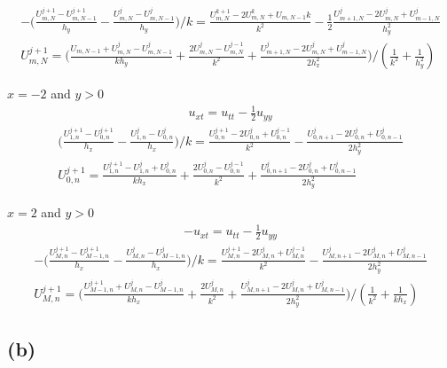 \documentclass[en,hazy,screen,blue,normal]{elegantnote}
\begin{document}
\begin{align*}
    - \biggl(\frac{U_{m, N}^{j+1} - U_{m, N-1}^{j+1}}{h_y} - \frac{U_{m, N}^j - U_{m, N-1}^j}{h_y}\biggr)/k = \frac{U_{m,N}^{k+1} - 2U_{m,N}^{k} + U_{m,N-1}{k}}{k^2} - \frac{1}{2} \frac{U_{m+1, N}^{j} - 2U_{m,N}^j + U_{m-1, N}^j}{h_y^2} \\
    U_{m, N}^{j+1} = \biggl(\frac{U_{m, N-1} + U_{m,N}^j - U_{m, N-1}^j}{k h_y} + \frac{2U_{m,N}^j - U_{m, N}^{j-1}}{k^2} + \frac{U_{m+1, N}^j - 2U_{m, N}^j + U_{m-1, N}^j}{2h_x^2} \biggr)/(\frac{1}{k^2} + \frac{1}{h_y^2})
\end{align*}

$x=-2$ and $y>0$
\begin{align*}
    u_{xt} = u_{tt} - \frac{1}{2} u_{yy}
\end{align*}
\begin{align*}
    \biggl(\frac{U_{1, n}^{j+1} - U_{0, n}^{j+1}}{h_x} - \frac{U_{1, n}^{j} - U_{0, n}^{j}}{h_x}\biggr)/k
    = \frac{U_{0, n}^{j+1} - 2U_{0, n}^j + U_{0, n}^{j-1}}{k^2} - \frac{U_{0, n+1}^j - 2U_{0, n}^j + U_{0, n-1}^j}{2 h_y^2} \\
    U_{0, n}^{j+1} = \frac{U_{1, n}^{j+1} - U_{1, n}^{j} + U_{0, n}^j}{k h_x} + \frac{2 U_{0, n}^{j} - U_{0, n}^{j-1}}{k^2} + \frac{U_{0, n+1}^{j} - 2U_{0, n}^j + U_{0, n-1}^j}{2h_y^2}
\end{align*}

$x = 2$ and $y>0$
\begin{align*}
    - u_{xt} = u_{tt} - \frac{1}{2} u_{yy}
\end{align*}
\begin{align*}
    - \biggl(\frac{U_{M, n}^{j+1} - U_{M-1, n}^{j+1}}{h_x} - \frac{U_{M, n}^{j} - U_{M-1, n}^{j}}{h_x}\biggr)/k
    = \frac{U_{M, n}^{j+1} -2U_{M, n}^j + U_{M, n}^{j-1}}{k^2} -\frac{U_{M, n+1}^j - 2U_{M, n}^j + U_{M, n-1}^j}{2h_y^2} \\
    U_{M, n}^{j+1} = \biggl(\frac{U_{M-1, n}^{j+1} +U_{M, n}^j -U_{M-1, n}^j}{k h_x} + \frac{2U_{M, n}^j}{k^2} + \frac{U_{M, n+1}^j - 2U_{M, n}^j + U_{M, n-1}^j}{2h_y^2}\biggr)/(\frac{1}{k^2} + \frac{1}{k h_x})
\end{align*}



\subsection{(b)}
\end{document}
